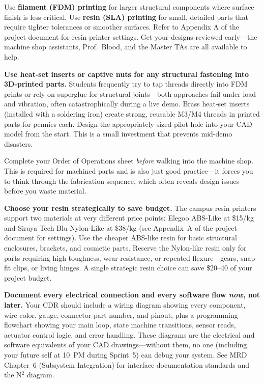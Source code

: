 \documentclass[11pt,letterpaper]{article}
\begin{document}
\begin{faqbox}
Use \textbf{filament (FDM) printing} for larger structural components where surface finish is less critical. Use \textbf{resin (SLA) printing} for small, detailed parts that require tighter tolerances or smoother surfaces. Refer to Appendix A of the project document for resin printer settings. Get your designs reviewed early---the machine shop assistants, Prof.\ Blood, and the Master TAs are all available to help.
\end{faqbox}

\begin{protip}
\textbf{Use heat-set inserts or captive nuts for any structural fastening into 3D-printed parts.} Students frequently try to tap threads directly into FDM prints or rely on superglue for structural joints---both approaches fail under load and vibration, often catastrophically during a live demo. Brass heat-set inserts (installed with a soldering iron) create strong, reusable M3/M4 threads in printed parts for pennies each. Design the appropriately sized pilot hole into your CAD model from the start. This is a small investment that prevents mid-demo disasters.
\end{protip}

\begin{tipbox}
Complete your Order of Operations sheet \textit{before} walking into the machine shop. This is required for machined parts and is also just good practice---it forces you to think through the fabrication sequence, which often reveals design issues before you waste material.
\end{tipbox}

\begin{protip}
\textbf{Choose your resin strategically to save budget.} The campus resin printers support two materials at very different price points: Elegoo ABS-Like at \$15/kg and Siraya Tech Blu Nylon-Like at \$38/kg (see Appendix~A of the project document for settings). Use the cheaper ABS-like resin for basic structural enclosures, brackets, and cosmetic parts. Reserve the Nylon-like resin only for parts requiring high toughness, wear resistance, or repeated flexure---gears, snap-fit clips, or living hinges. A single strategic resin choice can save \$20--40 of your project budget.
\end{protip}

\begin{tipbox}
\textbf{Document every electrical connection and every software flow \textit{now}, not later.} Your CDR should include a wiring diagram showing every component, wire color, gauge, connector part number, and pinout, plus a programming flowchart showing your main loop, state machine transitions, sensor reads, actuator control logic, and error handling. These diagrams are the electrical and software equivalents of your CAD drawings---without them, no one (including your future self at 10~PM during Sprint~5) can debug your system. See MRD Chapter~6 (Subsystem Integration) for interface documentation standards and the N$^2$ diagram.
\end{tipbox}
\end{document}

